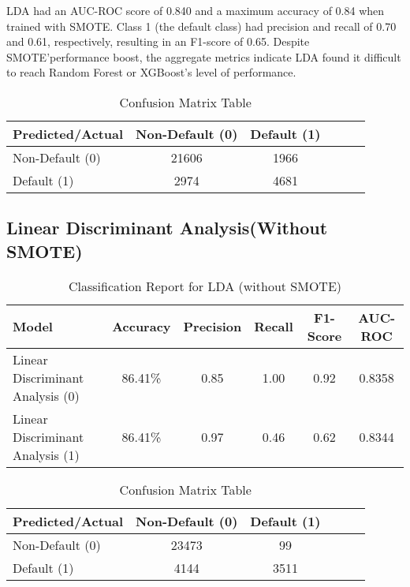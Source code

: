 \documentclass[12pt, a4paper,oneside]{book}
\numberwithin{equation}{section}
\begin{document}
LDA had an AUC-ROC score of 0.840 and a maximum accuracy of 0.84 when trained with SMOTE. Class 1 (the default class) had precision and recall of 0.70 and 0.61, respectively, resulting in an F1-score of 0.65. Despite SMOTE'performance boost, the aggregate metrics indicate LDA found it difficult to reach Random Forest or XGBoost's level of performance.

\begin{table}[h!]
\centering
\begin{tabular}{|l|c|c|c|c|c|}
\hline
\textbf{Predicted/Actual} & \textbf{Non-Default (0)} & \textbf{	Default (1)} \\ \hline
Non-Default (0) &	21606 & 1966  \\ \hline
Default (1) & 	2974 & 4681 \\ \hline
\end{tabular}
\caption{Confusion Matrix Table}
\end{table}

\subsection{Linear Discriminant Analysis(Without SMOTE)}
\begin{table}[h!]
\centering
\begin{tabular}{|l|c|c|c|c|c|}
\hline
\textbf{Model} & \textbf{Accuracy} & \textbf{Precision} & \textbf{Recall} & \textbf{F1-Score} & \textbf{AUC-ROC} \\ \hline
Linear Discriminant Analysis (0)& 86.41\% & 0.85& 1.00& 0.92 &0.8358\\ \hline
Linear Discriminant Analysis (1)& 86.41\% & 0.97& 0.46& 0.62 &0.8344\\ \hline
\end{tabular}
\caption{Classification Report for LDA (without SMOTE)}
\end{table}


\begin{table}[h!]
\centering
\begin{tabular}{|l|c|c|c|c|c|}
\hline
\textbf{Predicted/Actual} & \textbf{Non-Default (0)} & \textbf{	Default (1)} \\ \hline
Non-Default (0) &	23473 &99  \\ \hline
Default (1) & 	4144 & 3511\\ \hline
\end{tabular}
\caption{Confusion Matrix Table}
\end{table}
\end{document}
